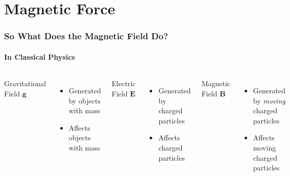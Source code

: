\documentclass[12pt,aspectratio=169]{beamer}
\newcommand{\mb}[1]{\mathbf{#1}}
\begin{document}
\section{Magnetic Force}


\begin{frame}
  \frametitle{So What Does the Magnetic Field Do?}
  \framesubtitle{In Classical Physics}
  \begin{columns}
    \begin{center}
      Gravitational Field $\mb{g}$
    \end{center}
    \begin{itemize}
    \item Generated by objects with mass
    \item Affects objects with mass
    \end{itemize}

    \begin{center}
      Electric Field $\mb{E}$
    \end{center}
    \begin{itemize}
    \item Generated by charged particles
    \item Affects charged particles
    \end{itemize}

    \begin{center}
      Magnetic Field $\mb{B}$
    \end{center}
    \begin{itemize}
    \item Generated by \emph{moving} charged particles
    \item Affects moving charged particles
    \end{itemize}
  \end{columns}
\end{frame}
\end{document}
